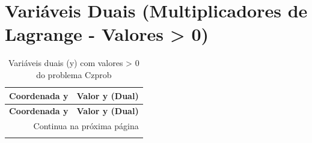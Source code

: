 \documentclass[12pt]{article}
\begin{document}
\section{Variáveis Duais (Multiplicadores de Lagrange - Valores > 0)}

\begin{longtable}{@{}cc@{}}
\caption{Variáveis duais (y) com valores > 0 do problema Czprob} \\
\toprule
\textbf{Coordenada y} & \textbf{Valor y (Dual)} \\
\midrule
\endfirsthead

\toprule
\textbf{Coordenada y} & \textbf{Valor y (Dual)} \\
\midrule
\endhead

\midrule \multicolumn{2}{r}{{Continua na próxima página}} \\ \midrule
\endfoot


\end{longtable}
\end{document}
